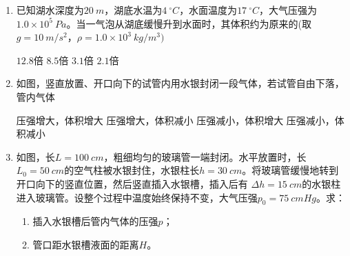 

\begin{enumerate}[leftmargin=0em]
\renewcommand{\labelenumi}{\arabic{enumi}.}
\item
{}
已知湖水深度为$ 20 \ m $，湖底水温为$ 4\ ^{ \circ } C $，水面温度为$ 17\ ^{ \circ } C $，大气压强为$ 1.0 \times 10^5\ Pa $。当一气泡从湖底缓慢升到水面时，其体积约为原来的(取$ g=10 \ m/s ^{2} $，$ \rho =1.0 \times 10^3 \ kg/m^{3} ) $  


\fourchoices
{$ 12.8 $倍}
{$ 8.5 $倍}
{$ 3.1 $倍}
{$ 2.1 $倍}

\item 
{}
如图，竖直放置、开口向下的试管内用水银封闭一段气体，若试管自由下落，管内气体  


\begin{minipage}[h!]{0.7\linewidth}
\vspace{0.3em}
\fourchoices
{压强增大，体积增大}
{压强增大，体积减小}
{压强减小，体积增大}
{压强减小，体积减小}

\vspace{0.3em}
\end{minipage}
\hfill
\begin{minipage}[h!]{0.3\linewidth}
\flushright
\vspace{0.3em}

\vspace{0.3em}
\end{minipage}

\item 
{}
如图，长$ L=100 \ cm $，粗细均匀的玻璃管一端封闭。水平放置时，长$ L_0=50 \ cm $的空气柱被水银封住，水银柱长$ h=30 \ cm $。将玻璃管缓慢地转到开口向下的竖直位置，然后竖直插入水银槽，插入后有 $ \Delta h=15 \ cm $的水银柱进入玻璃管。设整个过程中温度始终保持不变，大气压强$ p_0=75 \ cmHg $。求：
\begin{enumerate}
\renewcommand{\labelenumi}{\arabic{enumi}.}
\item
插入水银槽后管内气体的压强$ p $；
\item 
管口距水银槽液面的距离$ H $。




\end{enumerate}
\end{enumerate}

